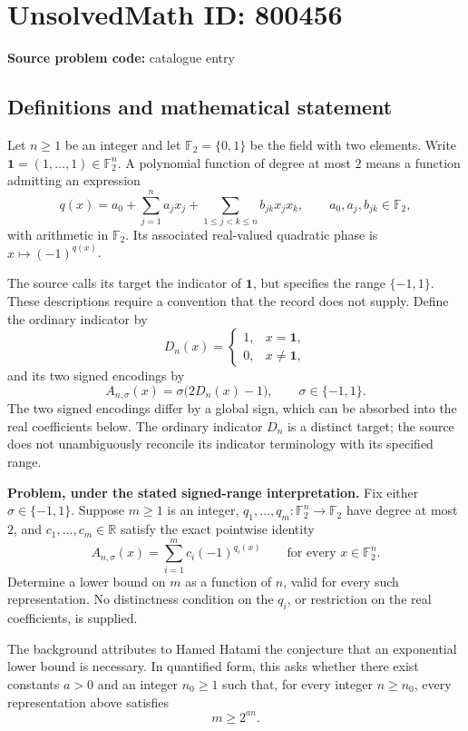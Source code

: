 \documentclass[11pt]{article}
\newcommand{\R}{\mathbb{R}}
\newcommand{\F}{\mathbb{F}}
\begin{document}
\section*{UnsolvedMath ID: 800456}
\textbf{Source problem code:} catalogue entry
\subsection{Definitions and mathematical statement}
Let \(n\geq 1\) be an integer and let \(\F_2=\{0,1\}\) be the field with two elements. Write \(\mathbf{1}=(1,\ldots,1)\in\F_2^n\). A polynomial function of degree at most \(2\) means a function admitting an expression
\[
q(x)=a_0+\sum_{j=1}^n a_jx_j+\sum_{1\leq j<k\leq n}b_{jk}x_jx_k,
\qquad a_0,a_j,b_{jk}\in\F_2,
\]
with arithmetic in \(\F_2\). Its associated real-valued quadratic phase is \(x\mapsto(-1)^{q(x)}\).

The source calls its target the indicator of \(\mathbf{1}\), but specifies the range \(\{-1,1\}\). These descriptions require a convention that the record does not supply. Define the ordinary indicator by
\[
D_n(x)=\begin{cases}1,&x=\mathbf{1},\\0,&x\ne\mathbf{1},\end{cases}
\]
and its two signed encodings by
\[
A_{n,\sigma}(x)=\sigma\bigl(2D_n(x)-1\bigr),\qquad \sigma\in\{-1,1\}.
\]
The two signed encodings differ by a global sign, which can be absorbed into the real coefficients below. The ordinary indicator \(D_n\) is a distinct target; the source does not unambiguously reconcile its indicator terminology with its specified range.

\textbf{Problem, under the stated signed-range interpretation.} Fix either \(\sigma\in\{-1,1\}\). Suppose \(m\geq1\) is an integer, \(q_1,\ldots,q_m:\F_2^n\to\F_2\) have degree at most \(2\), and \(c_1,\ldots,c_m\in\R\) satisfy the exact pointwise identity
\[
A_{n,\sigma}(x)=\sum_{i=1}^m c_i(-1)^{q_i(x)}
\qquad\text{for every }x\in\F_2^n.
\]
Determine a lower bound on \(m\) as a function of \(n\), valid for every such representation. No distinctness condition on the \(q_i\), or restriction on the real coefficients, is supplied.

The background attributes to Hamed Hatami the conjecture that an exponential lower bound is necessary. In quantified form, this asks whether there exist constants \(a>0\) and an integer \(n_0\geq1\) such that, for every integer \(n\geq n_0\), every representation above satisfies
\[
m\geq 2^{an}.
\]
\end{document}
